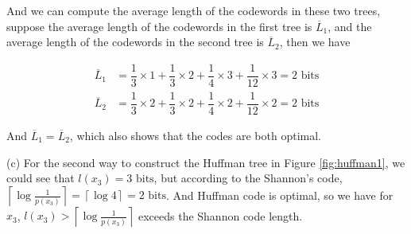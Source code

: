 And we can compute the average length of the codewords in these two trees, suppose the average length of the codewords in the first tree is $\overline{L}_1$, and the average length of the codewords in the second tree is $\overline{L}_2$, then we have

\begin{align*}
\overline{L}_1 &= \dfrac{1}{3}\times1+\dfrac{1}{3}\times2+\dfrac{1}{4}\times3+\dfrac{1}{12}\times3=2 \text{\ bits} \\
\overline{L}_2 &= \dfrac{1}{3}\times2+\dfrac{1}{3}\times2+\dfrac{1}{4}\times2+\dfrac{1}{12}\times2=2 \text{\ bits}
\end{align*}

And $\overline{L}_1=\overline{L}_2$, which also shows that the codes are both optimal.

(c) For the second way to construct the Huffman tree in Figure \ref{fig:huffman1}, we could see that $l(x_3)=3\text{\ bits}$, but according to the Shannon's code, $\left\lceil\log\frac{1}{p(x_3)}\right\rceil=\left\lceil\log4\right\rceil=2\text{\ bits}$. And Huffman code is optimal, so we have for $x_3$, $l(x_3)>\left\lceil\log\frac{1}{p(x_3)}\right\rceil$ exceeds the Shannon code length.

\newpage